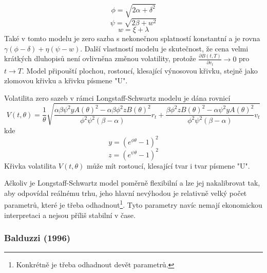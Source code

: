 \documentclass[a4paper]{book}
\begin{document}
\begin{equation*}
\phi = \sqrt{2 \alpha + \delta^2}
\end{equation*}
\begin{equation*}
\psi = \sqrt{2 \beta + w^2}
\end{equation*}
\begin{equation*}
w = \xi + \lambda
\end{equation*}
Také v tomto modelu je zero sazba s nekonečnou splatností konstantní a je rovna $\gamma(\phi - \delta) + \eta(\psi - w)$. Další vlastností modelu je skutečnost, že cena velmi krátkých dluhopisů není ovlivněna změnou volatility, protože $\frac{\partial B(t,T)}{\partial v_t} \rightarrow 0$ pro $t \rightarrow T$. Model připouští plochou, rostoucí, klesající výnosovou křivku, stejně jako zlomovou křivku a křivku písmene "U".

Volatilita zero sazeb v rámci Longstaff-Schwartz modelu je dána rovnicí
\begin{equation*}
V(t, \theta) = \frac{1}{\theta} \sqrt{\frac{\alpha \beta \psi^2yA(\theta)^2 - \alpha \beta \phi^2 z B(\theta)^2}{\phi^2 \psi^2 (\beta - \alpha)}r_t + \frac{\beta \phi^2 z B(\theta)^2 - \alpha \psi^2 y A(\theta)^2}{\phi^2 \psi^2 (\beta - \alpha)}v_t}
\end{equation*}
kde
\begin{equation*}
y = (e^{\phi \theta} - 1)^2
\end{equation*}
\begin{equation*}
z = (e^{\psi \theta} - 1)^2
\end{equation*}
Křivka volatilita $V(t, \theta)$ může mít rostoucí, klesající tvar i tvar písmene "U".

Ačkoliv je Longstaff-Schwartz model poměrně flexibilní a lze jej nakalibrovat tak, aby odpovídal reálnému trhu, jeho hlavní nevýhodou je relativně velký počet parametrů, které je třeba odhadnout\footnote{Konkrétně je třeba odhadnout devět parametrů.}. Tyto parametry navíc nemají ekonomickou interpretaci a nejsou příliš stabilní v čase.

\subsubsection{Balduzzi (1996)}
\end{document}
